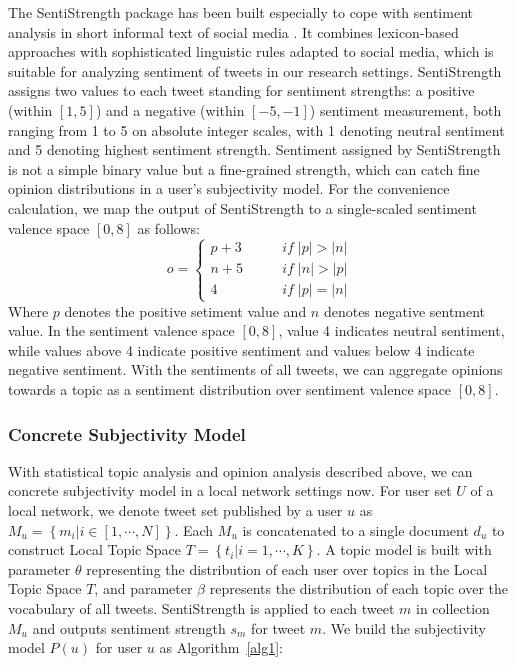 \documentclass[twocolumn]{svjour3}          %
\begin{document}
The SentiStrength package has been built especially to cope with sentiment analysis in short informal text of social media \cite{Thelwall:2010SSS}. 
It combines lexicon-based approaches with sophisticated linguistic rules adapted to social media, which is suitable for analyzing sentiment of tweets in our research settings. 
SentiStrength assigns two values to each tweet standing for sentiment strengths: a positive (within $ [1,5] $) and a negative (within $ [-5,-1] $) sentiment measurement, both ranging from 1 to 5 on absolute integer scales, with 1 denoting neutral sentiment and 5 denoting highest sentiment strength. 
Sentiment assigned by SentiStrength is not a simple binary value but a fine-grained strength, which can catch fine opinion distributions in a user's subjectivity model. 
For the convenience calculation, we map the output of SentiStrength to a single-scaled sentiment valence space $ [0, 8] $ as follows: 
\begin{equation}
\label{opinionmap}
o= \left\{ 
\begin{array}{lll}
{p+3} &  \qquad if \; \vert p \vert > \vert n \vert \\
{n+5} &  \qquad if \; \vert n \vert > \vert p \vert \\
{4}  &   \qquad if \; \vert p \vert = \vert n \vert
\end{array}
\right.
\end{equation}
Where $ p $ denotes the positive setiment value and $ n $ denotes negative sentment value.
In the sentiment valence space $ [0, 8] $, value 4 indicates neutral sentiment, while values above 4 indicate positive sentiment and values below 4 indicate negative sentiment. With the sentiments of all tweets, we can aggregate opinions towards a topic as a sentiment distribution over sentiment valence space $ [0, 8] $.

\subsubsection{Concrete Subjectivity Model}
\label{concrete}

With statistical topic analysis and opinion analysis described above, we can concrete subjectivity model in a local network settings now. 
For user set $ U $ of a local network, we denote tweet set published by a user $ u $ as $ M_{u}=\left\lbrace m_{i} \vert i \in \left[ 1, \cdots, N \right]  \right\rbrace$. Each $ M_{u} $ is concatenated to a single document $ d_{u} $ to construct Local Topic Space $ T=\left\lbrace t_{i} \vert i=1, \cdots, K \right\rbrace $.
A topic model is built with parameter $ \theta $ representing the distribution of each user over topics in the Local Topic Space $ T $, and
parameter $ \beta $ represents the distribution of each topic over the vocabulary of all tweets. SentiStrength is applied to each tweet $ m $ in collection $ M_{u} $ and outputs sentiment strength $ s_{m} $ for tweet $ m $. 
We build the subjectivity model $ P(u) $ for user $ u $ as Algorithm~\ref{alg1}:
\end{document}

